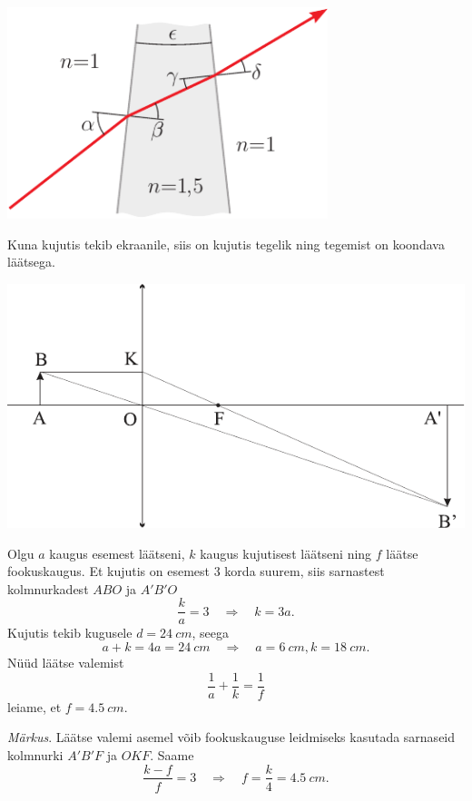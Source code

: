 \documentclass[10pt, twoside]{article}
\begin{document}
{\begin{center}
	\includegraphics[width=0.7\textwidth]{2007-v3g-03-yl}
\end{center}
\probend
\bigskip


\solu
Kuna kujutis tekib ekraanile, siis on kujutis tegelik ning tegemist on koondava läätsega.

\begin{center}
	\includegraphics[width=0.9\linewidth]{2009-lahg-02-lah}
\end{center}

Olgu $a$ kaugus esemest läätseni, $k$ kaugus kujutisest läätseni ning $f$ läätse fookuskaugus. Et kujutis on esemest \num{3} korda suurem, siis sarnastest kolmnurkadest $ABO$ ja $A'B'O$
\[
\frac{k}{a}=3 \quad \Rightarrow \quad k=3 a.
\]
Kujutis tekib kugusele $d = \SI{24}{cm}$, seega
\[
a+k=4 a=\SI{24}{cm} \quad \Rightarrow \quad a=\SI{6}{cm}, k=\SI{18}{cm}.
\]
Nüüd läätse valemist
\[
\frac{1}{a}+\frac{1}{k}=\frac{1}{f}
\]
leiame, et $f = \SI{4,5}{cm}$.

\emph{Märkus}. Läätse valemi asemel võib fookuskauguse leidmiseks kasutada sarnaseid kolmnurki $A'B'F$ ja $OKF$. Saame
\[
\frac{k-f}{f}=3 \quad \Rightarrow \quad f=\frac{k}{4}=\SI{4,5}{cm}.
\]
\probend
\bigskip

}
\end{document}
